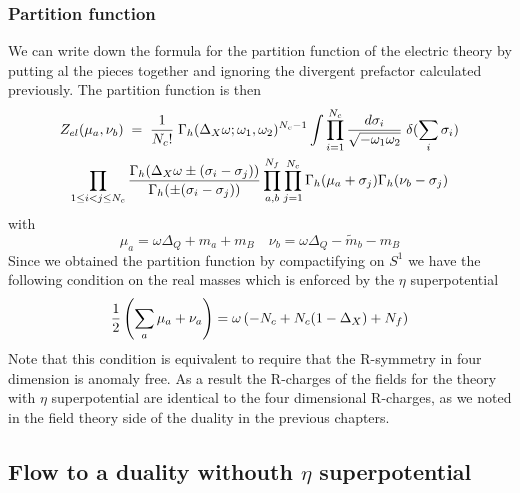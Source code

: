 \subsubsection{Partition function}
We can write down the formula for the partition function of the electric theory by putting al the pieces together and ignoring the divergent prefactor calculated previously. 
The partition function is then
\begin{multline}
Z_{el} ( \mu_a , \nu_b ) \; = 
\; {1 \over N_c ! } \;
\Gamma_h ( \Delta_X \omega ; \omega_1 , \omega_2)^{N_c-1}
\int
\prod_{i=1}^{N_c} \frac{d \sigma_i}{\sqrt{- \omega_1 \omega_2}} \; \delta( \sum_i \sigma_i)  \\
 \prod_{ 1 \leq i<j \leq N_c} \frac{ \Gamma_h( \Delta_X \omega \pm (\sigma_i - \sigma_j)) }{ \Gamma_h ( \pm (\sigma_i - \sigma_j) )}
 \prod_{a,b}^{N_f} \prod_{j=1}^{N_c} \Gamma_h ( \mu_a + \sigma_j) \Gamma_h ( \nu_b - \sigma_j)
\end{multline}
with 
\begin{equation}
 \mu_a = \omega \Delta_Q + m_a + m_B  \quad  \nu_b = \omega \Delta_Q - \tilde m_b - m_B
\end{equation}
Since we obtained the partition function by compactifying on $S^1$ we have the following condition on the real masses which is enforced by the $\eta$ superpotential
\begin{equation}
  { 1 \over 2 }\left(  \sum_a \mu_a + \nu_a  \right) = \omega \left( - N_c + N_c (1 - \Delta_X )  + N_f  \right)
  \label{eqn:R-symm Anomaly}
\end{equation}
Note that this condition is equivalent to require that the R-symmetry in four dimension is anomaly free. 
As a result the R-charges of the fields for the theory with $\eta$ superpotential are identical to the four dimensional R-charges, as we noted in the field theory side of the duality in the previous chapters.\\




\subsection{Flow to a duality withouth $\eta$ superpotential}

